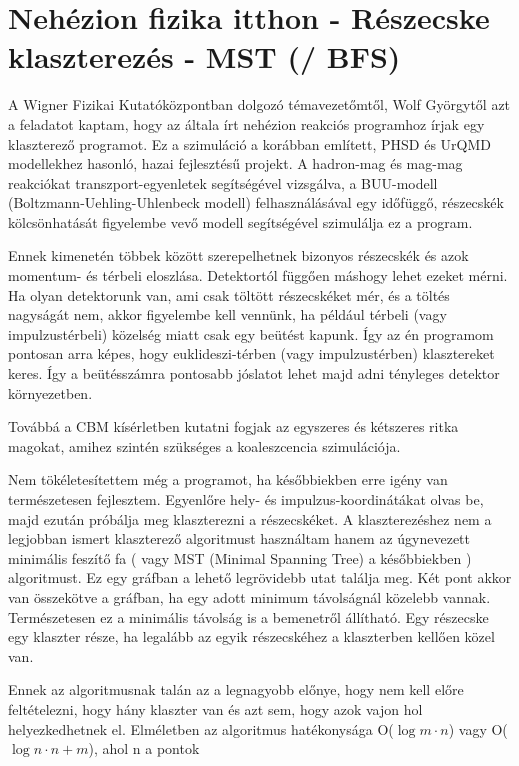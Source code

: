 \documentclass[a4paper,12pt]{article}
\begin{document}
\section{Nehézion fizika itthon - Részecske klaszterezés - MST (/ BFS)}
\par A Wigner Fizikai Kutatóközpontban dolgozó témavezetőmtől, Wolf Györgytől azt a feladatot kaptam, hogy az általa írt nehézion reakciós
programhoz írjak egy klaszterező programot. Ez a szimuláció a korábban említett, PHSD és UrQMD modellekhez hasonló, hazai fejlesztésű
projekt. A hadron-mag és mag-mag reakciókat transzport-egyenletek segítségével vizsgálva, a BUU-modell (Boltzmann-Uehling-Uhlenbeck modell) felhasználásával egy időfüggő, részecskék kölcsönhatását figyelembe vevő modell segítségével szimulálja ez a program.
\par Ennek kimenetén többek között szerepelhetnek bizonyos részecskék és azok momentum- és térbeli eloszlása. Detektortól függően máshogy lehet ezeket mérni. Ha olyan detektorunk van, ami csak töltött részecskéket mér, és a töltés nagyságát nem, akkor figyelembe kell vennünk, ha például térbeli (vagy impulzustérbeli) közelség miatt csak egy beütést kapunk. Így az én programom pontosan arra képes, hogy euklideszi-térben (vagy impulzustérben) klasztereket keres. Így a beütésszámra pontosabb jóslatot lehet majd adni tényleges detektor környezetben.
\par Továbbá a CBM kísérletben kutatni fogjak az egyszeres és kétszeres ritka magokat, amihez szintén szükséges a koaleszcencia szimulációja.
\par Nem tökéletesítettem még a programot, ha későbbiekben erre igény van természetesen fejlesztem. Egyenlőre hely- és impulzus-koordinátákat olvas be, majd ezután próbálja meg klaszterezni a részecskéket. A klaszterezéshez nem a legjobban ismert klaszterező algoritmust
használtam hanem az úgynevezett minimális feszítő fa ( vagy MST (Minimal Spanning Tree) a későbbiekben ) algoritmust. Ez egy gráfban a lehető legrövidebb utat találja meg. Két pont akkor van összekötve a gráfban, ha egy adott minimum távolságnál közelebb vannak. Természetesen ez a minimális távolság is a bemenetről állítható. Egy részecske egy klaszter része, ha legalább az egyik részecskéhez a klaszterben kellően közel van. 
\par Ennek az algoritmusnak talán az a legnagyobb előnye, hogy nem kell előre feltételezni, hogy hány klaszter van és azt sem, hogy azok vajon hol helyezkedhetnek el. Elméletben az algoritmus hatékonysága O($\log{m}\cdot n$) vagy O($\log{n}\cdot n + m$), ahol n a pontok
\end{document}
